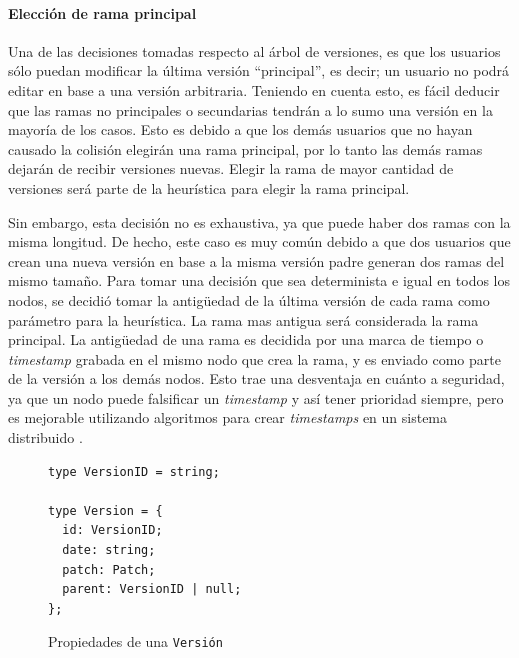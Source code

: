 \paragraph{Elección de rama principal}

Una de las decisiones tomadas respecto al árbol de versiones, es que los usuarios sólo puedan modificar la última versión “principal”, es decir; un usuario no podrá editar en base a una versión arbitraria. Teniendo en cuenta esto, es fácil deducir que las ramas no principales o secundarias tendrán a lo sumo una versión en la mayoría de los casos. Esto es debido a que los demás usuarios que no hayan causado la colisión elegirán una rama principal, por lo tanto las demás ramas dejarán de recibir versiones nuevas. Elegir la rama de mayor cantidad de versiones será parte de la heurística para elegir la rama principal.

Sin embargo, esta decisión no es exhaustiva, ya que puede haber dos ramas con la misma longitud. De hecho, este caso es muy común debido a que dos usuarios que crean una nueva versión en base a la misma versión padre generan dos ramas del mismo tamaño. Para tomar una decisión que sea determinista e igual en todos los nodos, se decidió tomar la antigüedad de la última versión de cada rama como parámetro para la heurística. La rama mas antigua será considerada la rama principal. La antigüedad de una rama es decidida por una marca de tiempo o \textit{timestamp} grabada en el mismo nodo que crea la rama, y es enviado como parte de la versión a los demás nodos. Esto trae una desventaja en cuánto a seguridad, ya que un nodo puede falsificar un \textit{timestamp} y así tener prioridad siempre, pero es mejorable utilizando algoritmos para crear \textit{timestamps} en un sistema distribuido \cite{distributed-timestamps}.

\begin{figure}[H]
    \centering
    \begin{minipage}{0.9\linewidth}
        \lstset{
            basicstyle=\ttfamily\small,
            frame=single,
            captionpos=b
        }
        \begin{lstlisting}
type VersionID = string;

type Version = {
  id: VersionID;
  date: string;
  patch: Patch;
  parent: VersionID | null;
};\end{lstlisting}
    \end{minipage}
    \caption{Propiedades de una \texttt{Versión}}
    \label{fig:version-type}
\end{figure}

